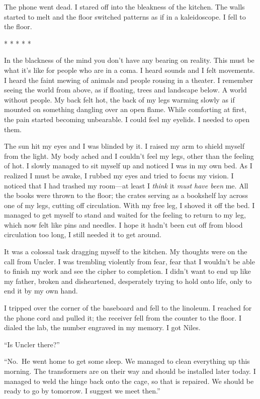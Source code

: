 The phone went dead. I stared off into the bleakness of the kitchen. The
walls started to melt and the floor switched patterns as if in a
kaleidoscope. I fell to the floor.

* * * * *

In the blackness of the mind you don't have any bearing on reality. This
must be what it's like for people who are in a coma. I heard sounds and
I felt movements. I heard the faint mewing of animals and people rousing
in a theater. I remember seeing the world from above, as if floating,
trees and landscape below. A world without people. My back felt hot, the
back of my legs warming slowly as if mounted on something dangling over
an open flame. While comforting at first, the pain started becoming
unbearable. I could feel my eyelids. I needed to open them.

The sun hit my eyes and I was blinded by it. I raised my arm to shield
myself from the light. My body ached and I couldn't feel my legs, other
than the feeling of hot. I slowly managed to sit myself up and noticed I
was in my own bed. As I realized I must be awake, I rubbed my eyes and
tried to focus my vision. I noticed that I had trashed my room---at
least I \emph{think} it \emph{must have been} me. All the books were
thrown to the floor; the crates serving as a bookshelf lay across one of
my legs, cutting off circulation. With my free leg, I shoved it off the
bed. I managed to get myself to stand and waited for the feeling to
return to my leg, which now felt like pins and needles. I hope it hadn't
been cut off from blood circulation too long, I still needed it to get
around.

It was a colossal task dragging myself to the kitchen. My thoughts were
on the call from Uncler. I was trembling violently from fear, fear that
I wouldn't be able to finish my work and see the cipher to completion. I
didn't want to end up like my father, broken and disheartened,
desperately trying to hold onto life, only to end it by my own hand.

I tripped over the corner of the baseboard and fell to the linoleum. I
reached for the phone cord and pulled it; the receiver fell from the
counter to the floor. I dialed the lab, the number engraved in my
memory. I got Niles.

``Is Uncler there?''

``No.~He went home to get some sleep. We managed to clean everything up
this morning. The transformers are on their way and should be installed
later today. I managed to weld the hinge back onto the cage, so that is
repaired. We should be ready to go by tomorrow. I suggest we meet
then.''

